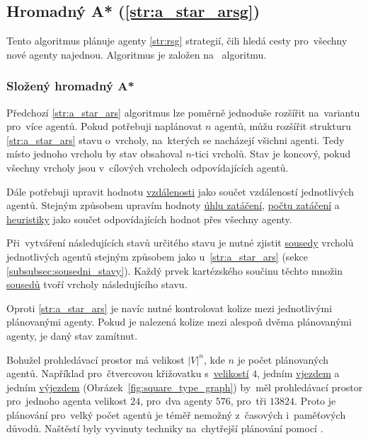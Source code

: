 \subsection{Hromadný A* (\ref{str:a_star_arsg})}\label{subsec:hromadny_a_star}


Tento algoritmus plánuje agenty \ref{str:rsg} strategií, čili hledá cesty pro~všechny nové agenty najednou.
Algoritmus je založen na~ algoritmu.

\subsubsection{Složený hromadný A*}\label{subsubsec:arsg_slozeny_hromadny}
Předchozí \ref{str:a_star_ars} algoritmus lze poměrně jednoduše rozšířit na~variantu pro~více agentů.
Pokud potřebuji naplánovat $n$ agentů, můžu rozšířit strukturu \ref{str:a_star_ars} stavu o~vrcholy,
na~kterých se nacházejí všichni agenti.
Tedy místo jednoho vrcholu by stav obsahoval $n$-tici vrcholů.
Stav je koncový, pokud všechny vrcholy jsou v~cílových vrcholech odpovídajících agentů.

Dále potřebuji upravit hodnotu \hyperref[par:ars_vzdalenost]{vzdálenosti} jako součet vzdáleností jednotlivých agentů.
Stejným způsobem upravím hodnoty \hyperref[par:ars_uhel_zataceni]{úhlu zatáčení},
\hyperref[par:ars_pocet_zataceni]{počtu zatáčení} a \hyperref[par:ars_heuristika]{heuristiky} jako součet
odpovídajících hodnot přes všechny agenty.

Při~vytváření následujících stavů určitého stavu je nutné zjistit \hyperref[str:ars_sousedi]{sousedy} vrcholů
jednotlivých agentů stejným způsobem jako u~\ref{str:a_star_ars} (sekce \ref{subsubsec:sousedni_stavy}).
Každý prvek kartézského součinu těchto množin \hyperref[str:ars_sousedi]{sousedů} tvoří vrcholy následujícího stavu.

Oproti \ref{str:a_star_ars} je navíc nutné kontrolovat kolize mezi jednotlivými plánovanými agenty.
Pokud je nalezená kolize mezi alespoň dvěma plánovanými agenty, je daný stav zamítnut.

Bohužel prohledávací prostor má velikost $|V|^n$, kde $n$ je počet plánovaných agentů.
Například pro~čtvercovou křižovatku s~\hyperref[par:velikost_krizovatky]{velikostí} $4$,
jedním \hyperref[par:vjezdy]{vjezdem} a jedním \hyperref[par:vyjezdy]{výjezdem} (Obrázek~\ref{fig:square_type_graph})
by~měl prohledávací prostor pro~jednoho agenta velikost $24$, pro~dva agenty $576$, pro~tři $13824$.
Proto je plánování pro~velký počet agentů je téměř nemožný z~časových i~paměťových důvodů.
Naštěstí byly vyvinuty techniky na~chytřejší plánování pomocí .

